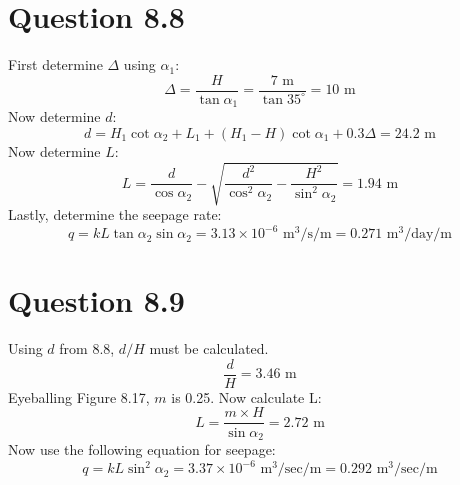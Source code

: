 \documentclass{article}
\begin{document}
\section*{Question 8.8}
First determine $\Delta$ using $\alpha_1$: 
\[\Delta = \frac{H}{\tan\alpha_1}=\frac{7\text{ m}}{\tan 35^\circ}=10 \text{ m}\]
Now determine $d$:
\[d=H_1\cot \alpha_2+L_1+(H_1-H)\cot \alpha_1+0.3\Delta=24.2\text{ m}\]
Now determine $L$:
\[L=\frac{d}{\cos\alpha_2}-\sqrt{\frac{d^2}{\cos^2\alpha_2}-\frac{H^2}{\sin^2\alpha_2}}=1.94\text{ m}\]
Lastly, determine the seepage rate:
\[q=kL\tan\alpha_2\sin\alpha_2=3.13\times 10^{-6}\text{ m}^3\text{/s/m}=\boxed{0.271\text{ m}^3\text{/day/m}}\]
\section*{Question 8.9}
Using $d$ from 8.8, $d/H$ must be calculated.
\[\frac{d}{H}=3.46\text{ m}\] 
Eyeballing Figure 8.17, $m$ is 0.25. Now calculate L:
\[L=\frac{m\times H}{\sin\alpha_2}=2.72\text{ m}\] 
Now use the following equation for seepage: 
\[q=kL\sin^2\alpha_2=3.37\times 10^{-6} \text{ m}^3\text{/sec/m}=\boxed{0.292\text{ m}^3\text{/sec/m}}\]
\end{document}
